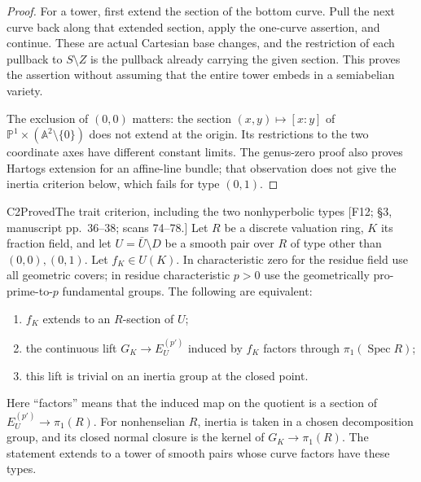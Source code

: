 \begin{proof}
For a tower, first extend the section of the bottom curve. Pull the next
curve back along that extended section, apply the one-curve assertion, and
continue. These are actual Cartesian base changes, and the restriction of
each pullback to $S\setminus Z$ is the pullback already carrying the given
section. This proves the assertion without assuming that the entire tower
embeds in a semiabelian variety.

The exclusion of $(0,0)$ matters: the section
$(x,y)\mapsto[x:y]$ of $\mathbb P^1\times(\mathbb A^2\setminus\{0\})$
does not extend at the origin. Its restrictions to the two coordinate axes
have different constant limits. The genus-zero proof also proves Hartogs
extension for an affine-line bundle; that observation does not give the
inertia criterion below, which fails for type $(0,1)$.
\end{proof}

\begin{result}{C2}{Proved}{The trait criterion, including the two nonhyperbolic types}
\textup{[F12; \S3, manuscript pp.\ 36--38; scans 74--78.]}
Let $R$ be a discrete valuation ring, $K$ its fraction field, and let
$U=\bar U\setminus D$ be a smooth pair over $R$ of type other than
$(0,0),(0,1)$. Let $f_K\in U(K)$. In characteristic zero for the residue
field use all geometric covers; in residue characteristic $p>0$ use the
geometrically pro-prime-to-$p$ fundamental groups. The following are
equivalent:
\begin{enumerate}
\item $f_K$ extends to an $R$-section of $U$;
\item the continuous lift $G_K\to E_U^{(p')}$ induced by $f_K$ factors
through $\pi_1(\operatorname{Spec}R)$;
\item this lift is trivial on an inertia group at the closed point.
\end{enumerate}
Here ``factors'' means that the induced map on the quotient is a section
of $E_U^{(p')}\to\pi_1(R)$. For nonhenselian $R$, inertia is taken in a
chosen decomposition group, and its closed normal closure is the kernel
of $G_K\to\pi_1(R)$. The statement extends to a tower of smooth pairs
whose curve factors have these types.
\end{result}

